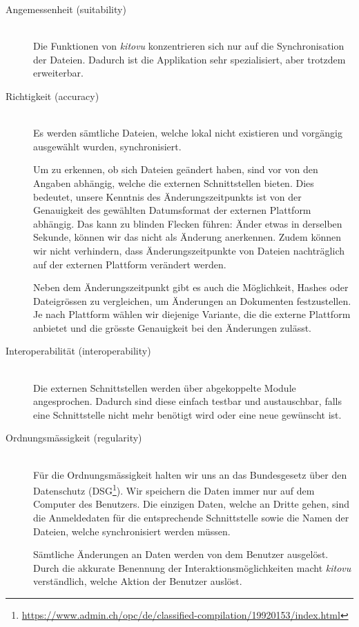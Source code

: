 \documentclass[a4paper]{article}
\begin{document}
\begin{description}
  \item[Angemessenheit (suitability)] \strut \\
    Die Funktionen von \emph{kitovu} konzentrieren sich nur auf die Synchronisation der Dateien.
    Dadurch ist die Applikation sehr spezialisiert, aber trotzdem erweiterbar.
  \item[Richtigkeit (accuracy)] \strut \\
    Es werden sämtliche Dateien, welche lokal nicht existieren und vorgängig ausgewählt wurden, synchronisiert.

    Um zu erkennen, ob sich Dateien geändert haben, sind vor von den Angaben abhängig, welche die externen Schnittstellen bieten.
    Dies bedeutet, unsere Kenntnis des Änderungszeitpunkts ist von der Genauigkeit des gewählten Datumsformat der externen Plattform abhängig. Das kann zu blinden Flecken führen: Änder etwas in derselben Sekunde, können wir das nicht als Änderung anerkennen. Zudem können wir nicht verhindern, dass Änderungszeitpunkte von Dateien nachträglich auf der externen Plattform verändert werden.
    
    Neben dem Änderungszeitpunkt gibt es auch die Möglichkeit, Hashes oder Dateigrössen zu vergleichen, um Änderungen an Dokumenten festzustellen. Je nach Plattform wählen wir diejenige Variante, die die externe Plattform anbietet und die grösste Genauigkeit bei den Änderungen zulässt.
  \item[Interoperabilität (interoperability)] \strut \\
    Die externen Schnittstellen werden über abgekoppelte Module angesprochen.
    Dadurch sind diese einfach testbar und austauschbar, falls eine Schnittstelle nicht mehr benötigt wird oder eine neue gewünscht ist.
  \item[Ordnungsmässigkeit (regularity)] \strut \\
    Für die Ordnungsmässigkeit halten wir uns an das Bundesgesetz über den Datenschutz (DSG\footnote{\url{https://www.admin.ch/opc/de/classified-compilation/19920153/index.html}}). Wir speichern die Daten immer nur auf dem Computer des Benutzers.
    Die einzigen Daten, welche an Dritte gehen, sind die Anmeldedaten für die entsprechende Schnittstelle sowie die Namen der Dateien, welche synchronisiert werden müssen.

    Sämtliche Änderungen an Daten werden von dem Benutzer ausgelöst. Durch die akkurate Benennung der Interaktionsmöglichkeiten macht \emph{kitovu} verständlich, welche Aktion der Benutzer auslöst.


\end{description}
\end{document}
